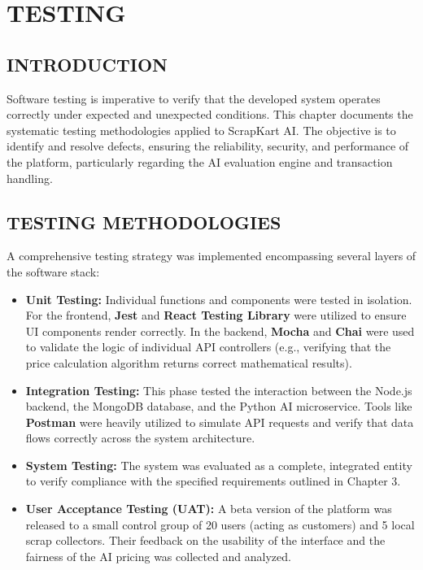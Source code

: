 \chapter{TESTING}

\section{INTRODUCTION}
Software testing is imperative to verify that the developed system operates correctly under expected and unexpected conditions. This chapter documents the systematic testing methodologies applied to ScrapKart AI. The objective is to identify and resolve defects, ensuring the reliability, security, and performance of the platform, particularly regarding the AI evaluation engine and transaction handling.

\section{TESTING METHODOLOGIES}
A comprehensive testing strategy was implemented encompassing several layers of the software stack:
\begin{itemize}
    \item \textbf{Unit Testing:} Individual functions and components were tested in isolation. For the frontend, \textbf{Jest} and \textbf{React Testing Library} were utilized to ensure UI components render correctly. In the backend, \textbf{Mocha} and \textbf{Chai} were used to validate the logic of individual API controllers (e.g., verifying that the price calculation algorithm returns correct mathematical results).
    \item \textbf{Integration Testing:} This phase tested the interaction between the Node.js backend, the MongoDB database, and the Python AI microservice. Tools like \textbf{Postman} were heavily utilized to simulate API requests and verify that data flows correctly across the system architecture.
    \item \textbf{System Testing:} The system was evaluated as a complete, integrated entity to verify compliance with the specified requirements outlined in Chapter 3.
    \item \textbf{User Acceptance Testing (UAT):} A beta version of the platform was released to a small control group of 20 users (acting as customers) and 5 local scrap collectors. Their feedback on the usability of the interface and the fairness of the AI pricing was collected and analyzed.
\end{itemize}

